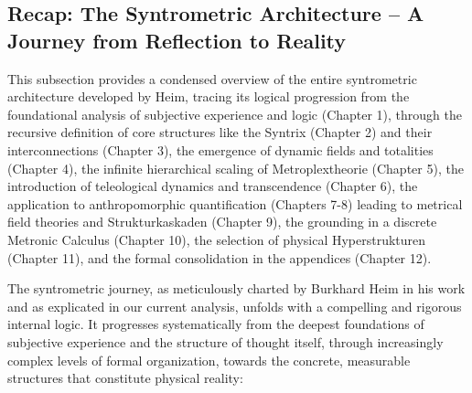 \documentclass[12pt]{article}
\begin{document}
\subsection{Recap: The Syntrometric Architecture – A Journey from Reflection to Reality}
\label{sec:recap_architecture}

This subsection provides a condensed overview of the entire syntrometric architecture developed by Heim, tracing its logical progression from the foundational analysis of subjective experience and logic (Chapter 1), through the recursive definition of core structures like the Syntrix (Chapter 2) and their interconnections (Chapter 3), the emergence of dynamic fields and totalities (Chapter 4), the infinite hierarchical scaling of Metroplextheorie (Chapter 5), the introduction of teleological dynamics and transcendence (Chapter 6), the application to anthropomorphic quantification (Chapters 7-8) leading to metrical field theories and Strukturkaskaden (Chapter 9), the grounding in a discrete Metronic Calculus (Chapter 10), the selection of physical Hyperstrukturen (Chapter 11), and the formal consolidation in the appendices (Chapter 12).

The syntrometric journey, as meticulously charted by Burkhard Heim in his work and as explicated in our current analysis, unfolds with a compelling and rigorous internal logic. It progresses systematically from the deepest foundations of subjective experience and the structure of thought itself, through increasingly complex levels of formal organization, towards the concrete, measurable structures that constitute physical reality:
\end{document}
